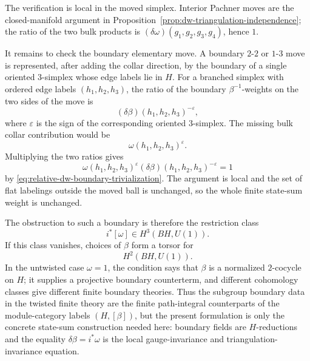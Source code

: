 The verification is local in the moved simplex.  Interior Pachner moves are
the closed-manifold argument in
Proposition~\ref{prop:dw-triangulation-independence}; the ratio of the two
bulk products is \((\delta\omega)(g_1,g_2,g_3,g_4)\), hence \(1\).

It remains to check the boundary elementary move.  A boundary \(2\)-\(2\) or
\(1\)-\(3\) move is represented, after adding the collar direction, by the
boundary of a single oriented \(3\)-simplex whose edge labels lie in \(H\).
For a branched simplex with ordered edge labels
\((h_1,h_2,h_3)\), the ratio of the boundary \(\beta^{-1}\)-weights on the
two sides of the move is
\[
  (\delta\beta)(h_1,h_2,h_3)^{-\varepsilon},
\]
where \(\varepsilon\) is the sign of the corresponding oriented
\(3\)-simplex.  The missing bulk collar contribution would be
\[
  \omega(h_1,h_2,h_3)^{\varepsilon}.
\]
Multiplying the two ratios gives
\[
  \omega(h_1,h_2,h_3)^{\varepsilon}
  (\delta\beta)(h_1,h_2,h_3)^{-\varepsilon}
  =
  1
\]
by \eqref{eq:relative-dw-boundary-trivialization}.  The argument is local
and the set of flat labelings outside the moved ball is unchanged, so the
whole finite state-sum weight is unchanged.

The obstruction to such a boundary is therefore the restriction class
\[
  i^*[\omega]\in H^3(BH,U(1)).
\]
If this class vanishes, choices of \(\beta\) form a torsor for
\[
  H^2(BH,U(1)).
\]
In the untwisted case \(\omega=1\), the condition says that \(\beta\) is a
normalized \(2\)-cocycle on \(H\); it supplies a projective boundary
counterterm, and different cohomology classes give different finite
boundary theories.  Thus the subgroup boundary data in the twisted finite
theory are the finite path-integral counterparts of the module-category
labels \((H,[\beta])\), but the present formulation is only the concrete
state-sum construction needed here: boundary fields are \(H\)-reductions and
the equality \(\delta\beta=i^*\omega\) is the local gauge-invariance and
triangulation-invariance equation.

